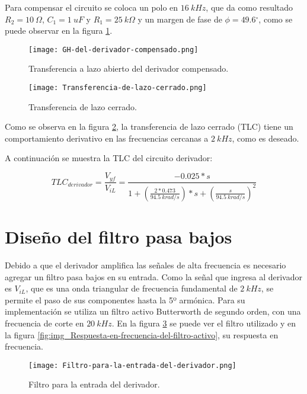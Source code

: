 \noindent Para compensar el circuito se coloca un polo en $16 \:kHz$, que da como resultado $R_2=10\:\Omega$, $C_1=1\:uF$ y $R_1=25\: k\Omega$ y un margen de fase de $\phi =49.6{}^\circ $, como se puede observar en la figura \ref{fig:img_GH del derivador compensado}.

\begin{figure}[H]
	\centering
	\texttt{[image: GH-del-derivador-compensado.png]}
	\caption{Transferencia a lazo abierto del derivador compensado.}
	\label{fig:img_GH del derivador compensado}
\end{figure}

\begin{figure}[H]
	\centering
	\texttt{[image: Transferencia-de-lazo-cerrado.png]}
	\caption{Transferencia de lazo cerrado.}
	\label{fig:img_Transferencia-de-lazo-cerrado}
\end{figure}

\noindent Como se observa en la figura \ref{fig:img_Transferencia-de-lazo-cerrado}, la transferencia de lazo cerrado (TLC) tiene un comportamiento derivativo en las frecuencias cercanas a $2 \:kHz$, como es deseado.

\noindent A continuaci\'{o}n se muestra la TLC del circuito derivador:
 
\begin{equation} \label{eq_Vyf-lineal}
	{TLC}_{derivador}=\frac{V_{yf}}{V_{iL}}=\frac{-0.025*s}{1+(\frac{2*0.473}{94.5\ krad/s})*s+(\frac{s}{94.5\ krad/s})^2}
\end{equation} 

\section{Dise\~{n}o del filtro pasa bajos}

\noindent Debido a que el derivador amplifica las se\~{n}ales de alta frecuencia es necesario agregar un filtro pasa bajos en su entrada. Como la se\~{n}al que ingresa al derivador es $V_{iL}$, que es una onda triangular de frecuencia fundamental de $2\:kHz$, se permite el paso de sus componentes hasta la 5º arm\'{o}nica. Para su implementaci\'{o}n se utiliza un filtro activo Butterworth de segundo orden, con una frecuencia de corte en $20\:kHz$. En la figura  \ref{fig:img_Filtro-para-la-entrada-del-derivador} se puede ver el filtro utilizado y en la figura \ref{fig:img_Respuesta-en-frecuencia-del-filtro-activo}, su respuesta en frecuencia.

\begin{figure}[H]
	\centering
	\texttt{[image: Filtro-para-la-entrada-del-derivador.png]}
	\caption{Filtro para la entrada del derivador.}
	\label{fig:img_Filtro-para-la-entrada-del-derivador}
\end{figure}

